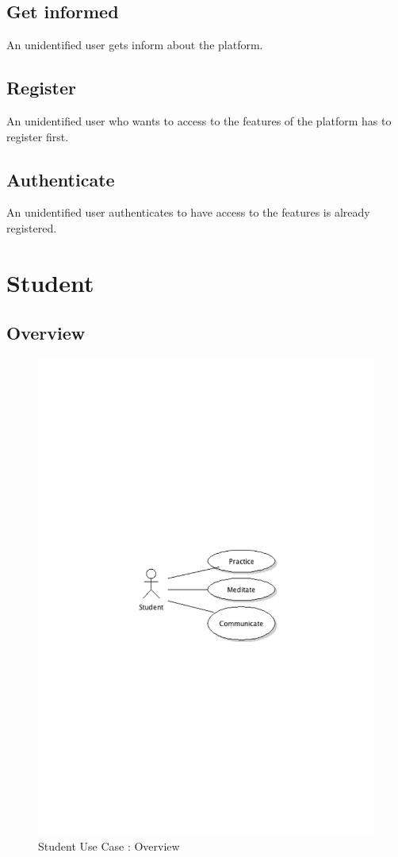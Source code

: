 	\subsection{Get informed}An unidentified user gets inform about the platform.
	\subsection{Register}An unidentified user who wants to access to the features of the platform has to register first.
	\subsection{Authenticate}An unidentified user authenticates to have access to the features is already registered.
\newpage
\section{Student}
	\subsection{Overview}
		\begin{figure}[ht]
			\begin{center}
				\includegraphics[width=\textwidth,  trim=2cm 12cm 2cm 12cm]{UML_figure/UC/student/UC_Student_General.pdf}
				\caption{Student Use Case : Overview}
			\end{center}
		\end{figure}

